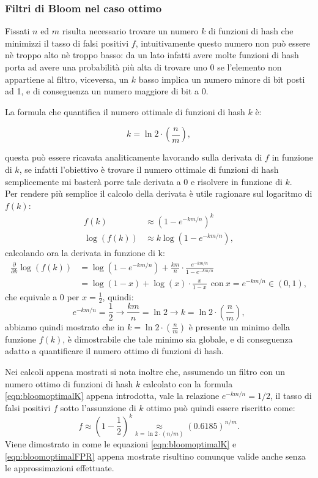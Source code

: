 \documentclass[../../main.tex]{subfiles}
\begin{document}
\subsubsection{Filtri di Bloom nel caso ottimo}
Fissati $n$ ed $m$ risulta necessario trovare un numero $k$ di funzioni di hash che minimizzi il tasso di falsi positivi $f$, intuitivamente questo numero non può essere nè troppo alto nè troppo basso: da un lato infatti avere molte funzioni di hash porta ad avere una probabilità più alta di trovare uno 0 se l'elemento non appartiene al filtro, viceversa, un $k$ basso implica un numero minore di bit posti ad 1, e di conseguenza un numero maggiore di bit a 0. 

La formula che quantifica il numero ottimale di funzioni di hash $k$ è:

\begin{equation}
    k = \ln{2} \cdot \left(\frac{n}{m}\right),
    \label{eqn:bloomoptimalK}
\end{equation}

questa può essere ricavata analiticamente lavorando sulla derivata di $f$ in funzione di $k$,  se infatti l'obiettivo è trovare il numero ottimale di funzioni di hash semplicemente mi basterà porre tale derivata a 0 e risolvere in funzione di $k$.\\
Per rendere più semplice il calcolo della derivata è utile ragionare sul logaritmo di $f(k)$:
\begin{align*}
    f(k) & \approx \left(1 - e^{-km/n}\right)^k\\
    \log(f(k)) & \approx k \log\left(1 - e^{-km/n}\right),
\end{align*}
calcolando ora la derivata in funzione di k:
\begin{align*}
    \frac{\partial}{\partial k} \log(f(k)) & = \log(1 - e^{-km/n}) + \frac{km}{n} \cdot \frac{e^{-km/n}}{1 - e^{-km/n}}\\
    &= \log(1 - x) + \log(x) \cdot \frac{x}{1 - x} \ \ \text{con} \ x = e^{-km/n} \in (0,1),
\end{align*}
che equivale a 0 per $ x = \frac{1}{2}$, quindi: 
\[e^{-km/n} = \frac{1}{2} \rightarrow \frac{km}{n} = \ln2 \rightarrow k =  \ln2 \cdot \left(\frac{n}{m}\right),\]
abbiamo quindi mostrato che in $k = \ln{2} \cdot \left(\frac{n}{m}\right)$ è presente un minimo della funzione $f(k)$, è dimostrabile che tale minimo sia globale, e di conseguenza adatto a quantificare il numero ottimo di funzioni di hash.

Nei calcoli appena mostrati si nota inoltre che, assumendo un filtro con un numero ottimo di funzioni di hash $k$ calcolato con la formula \ref{eqn:bloomoptimalK} appena introdotta, vale la relazione $e^{-km/n} = 1/2$, il tasso di falsi positivi $f$ sotto l'assunzione di $k$ ottimo può quindi essere riscritto come:
\begin{equation}
f \approx \left(1 - \frac{1}{2}\right)^k \underset{k = \ln{2} \cdot \left(n/m\right)}{\approx} (0.6185)^{n/m}.
\label{eqn:bloomoptimalFPR}
\end{equation}
Viene dimostrato in \cite{Broder2005} come le equazioni \ref{eqn:bloomoptimalK} e \ref{eqn:bloomoptimalFPR} appena mostrate risultino comunque valide anche senza le approssimazioni effettuate.
\end{document}
